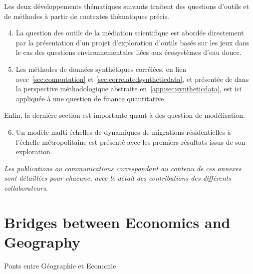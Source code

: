 Les deux développements thématiques suivants traitent des questions d'outils et de méthodes à partir de contextes thématiques précis.

\begin{enumerate}\setcounter{enumi}{3}
	\item La question des outils de la médiation scientifique est abordée directement par la présentation d'un projet d'exploration d'outils basés sur les jeux dans le cas des questions environnementales liées aux écosystèmes d'eau douce.
	\item Les méthodes de données synthétiques corrélées, en lien avec~\ref{sec:computation} et \ref{sec:correlatedsyntheticdata}, et présentée de dans la perspective méthodologique abstraite en~\ref{app:sec:syntheticdata}, est ici appliquée à une question de finance quantitative.
\end{enumerate}

Enfin, la dernière section est importante quant à des question de modélisation.
\begin{enumerate}\setcounter{enumi}{5}
	\item Un modèle multi-échelles de dynamiques de migrations résidentielles à l'échelle métropolitaine est présenté avec les premiers résultats issus de son exploration.
\end{enumerate}


\stars

\textit{Les publications ou communications correspondant au contenu de ces annexes sont détaillées pour chacune, avec le détail des contributions des différents collaborateurs.}




\newpage

\section{Bridges between Economics and Geography}{Ponts entre Géographie et Economie}


\label{app:sec:ecogeo}


